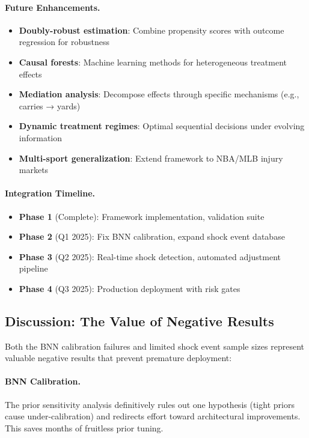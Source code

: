 \paragraph{Future Enhancements.}
\begin{itemize}
  \item \textbf{Doubly-robust estimation}: Combine propensity scores with outcome regression for robustness
  \item \textbf{Causal forests}: Machine learning methods for heterogeneous treatment effects
  \item \textbf{Mediation analysis}: Decompose effects through specific mechanisms (e.g., carries → yards)
  \item \textbf{Dynamic treatment regimes}: Optimal sequential decisions under evolving information
  \item \textbf{Multi-sport generalization}: Extend framework to NBA/MLB injury markets
\end{itemize}

\paragraph{Integration Timeline.}
\begin{itemize}
  \item \textbf{Phase 1} (Complete): Framework implementation, validation suite
  \item \textbf{Phase 2} (Q1 2025): Fix BNN calibration, expand shock event database
  \item \textbf{Phase 3} (Q2 2025): Real-time shock detection, automated adjustment pipeline
  \item \textbf{Phase 4} (Q3 2025): Production deployment with risk gates
\end{itemize}

\subsection{Discussion: The Value of Negative Results}

Both the BNN calibration failures and limited shock event sample sizes represent valuable negative results that prevent premature deployment:

\paragraph{BNN Calibration.}
The prior sensitivity analysis definitively rules out one hypothesis (tight priors cause under-calibration) and redirects effort toward architectural improvements. This saves months of fruitless prior tuning.

